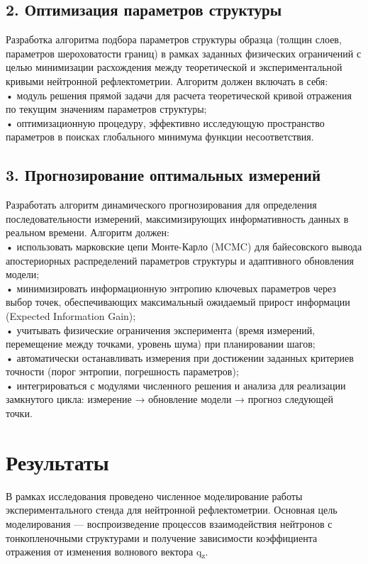 \documentclass[a4paper]{article}
\begin{document}
\subsection*{2. Оптимизация параметров структуры}
Разработка алгоритма подбора параметров структуры образца (толщин слоев, параметров шероховатости границ) в рамках заданных физических ограничений с целью минимизации расхождения между теоретической и экспериментальной кривыми нейтронной рефлектометрии. Алгоритм должен включать в себя:\\
•	модуль решения прямой задачи для расчета теоретической кривой отражения по текущим значениям параметров структуры;\\
•	оптимизационную процедуру, эффективно исследующую пространство параметров в поисках глобального минимума функции несоответствия.

\subsection*{3. Прогнозирование оптимальных измерений}
Разработать алгоритм динамического прогнозирования для определения последовательности измерений, максимизирующих информативность данных в реальном времени. Алгоритм должен:\\
•	использовать марковские цепи Монте-Карло (MCMC) для байесовского вывода апостериорных распределений параметров структуры и адаптивного обновления модели;\\
•	минимизировать информационную энтропию ключевых параметров через выбор точек, обеспечивающих максимальный ожидаемый прирост информации (Expected Information Gain);\\
•	учитывать физические ограничения эксперимента (время измерений, перемещение между точками, уровень шума) при планировании шагов;\\
•	автоматически останавливать измерения при достижении заданных критериев точности (порог энтропии, погрешность параметров);\\
•	интегрироваться с модулями численного решения и анализа для реализации замкнутого цикла: измерение → обновление модели → прогноз следующей точки.




\section*{Результаты}

В рамках исследования проведено численное моделирование работы экспериментального стенда для нейтронной рефлектометрии.
Основная цель моделирования — воспроизведение процессов взаимодействия нейтронов с тонкопленочными
структурами и получение зависимости коэффициента отражения от изменения волнового
вектора q\textsubscript{z}.
\end{document}

